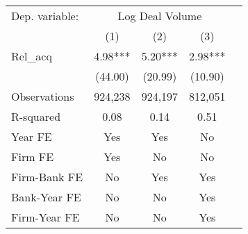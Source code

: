 {
\def\sym#1{\ifmmode^{#1}\else\(^{#1}\)\fi}
\begin{tabular*}{.8\hsize}{@{\hskip\tabcolsep\extracolsep\fill}l*{4}{c}}
\toprule
                Dep. variable: &\multicolumn{3}{c}{Log Deal Volume}                             \\\cmidrule(lr){2-4}
                &\multicolumn{1}{c}{(1)}   &\multicolumn{1}{c}{(2)}   &\multicolumn{1}{c}{(3)} \\
\midrule
Rel\_acq        &     4.98***&     5.20***&     2.98***  \\
                &  (44.00)   &  (20.99)   &  (10.90)     \\
\midrule
Observations    &  924,238   &  924,197   &  812,051   \\
R-squared       &     0.08   &     0.14   &     0.51  \\
\midrule Year FE &      Yes   &      Yes   &       No   \\
Firm FE         &      Yes   &       No   &       No  \\
Firm-Bank FE    &       No   &      Yes   &      Yes   \\
Bank-Year FE    &       No   &       No   &      Yes    \\
Firm-Year FE    &       No   &       No   &      Yes    \\
\bottomrule
\end{tabular*}
}
